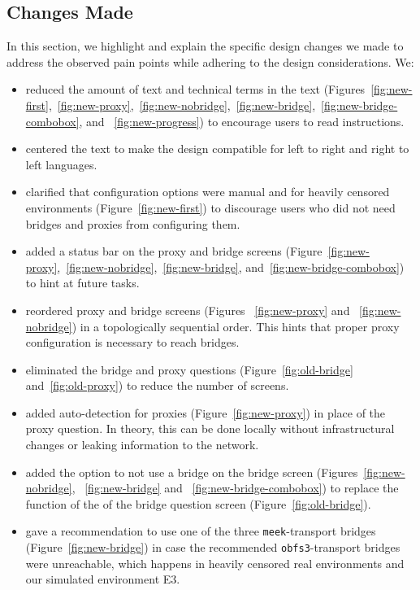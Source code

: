 \documentclass[USenglish,oneside,twocolumn]{article}
\begin{document}
\subsection{Changes Made} 
In this section, we highlight and explain the specific design changes we made to address the observed pain points while adhering to the design considerations. We: \\

\begin{itemize}
\item{reduced the amount of text and technical terms in the text (Figures~\ref{fig:new-first},~\ref{fig:new-proxy},~\ref{fig:new-nobridge},~\ref{fig:new-bridge},~\ref{fig:new-bridge-combobox}, and ~\ref{fig:new-progress})  to encourage users to read instructions.} 
\item{centered the text to make the design compatible for left to right and right to left languages.}
\item{clarified that configuration options were manual and for heavily censored environments (Figure~\ref{fig:new-first}) to discourage users who did not need bridges and proxies from configuring them.}
\item{added a status bar on the proxy and bridge screens (Figure~\ref{fig:new-proxy},~\ref{fig:new-nobridge},~\ref{fig:new-bridge}, and~\ref{fig:new-bridge-combobox}) to hint at future tasks.}
\item{reordered proxy and bridge screens (Figures ~\ref{fig:new-proxy} and ~\ref{fig:new-nobridge}) in a topologically sequential order. This hints that proper proxy configuration is necessary to reach bridges.}
\item{eliminated the bridge and proxy questions (Figure~\ref{fig:old-bridge} and~\ref{fig:old-proxy}) to reduce the number of screens.}
\item{added auto-detection for proxies (Figure~\ref{fig:new-proxy}) in place of the proxy question. In theory, this can be done locally without infrastructural changes or leaking information to the network.}
\item{added the option to not use a bridge on the bridge screen (Figures~\ref{fig:new-nobridge}, ~\ref{fig:new-bridge} and ~\ref{fig:new-bridge-combobox}) to replace the function of the of the bridge question screen (Figure~\ref{fig:old-bridge}).}
\item{gave a recommendation to use one of the three \texttt{meek}-transport bridges (Figure~\ref{fig:new-bridge}) in case the recommended \texttt{obfs3}-transport bridges were unreachable, which happens in heavily censored real environments and our simulated environment E3.}

\end{itemize}
\end{document}
